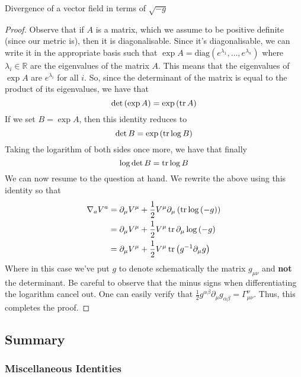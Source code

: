 \begin{thm}{Divergence of a vector field in terms of $\sqrt{ - g }  $}
\begin{proof}
	Observe that if $ A $ is a matrix, which we assume 
	to be positive definite (since our metric is), then 
	it is diagonalisable. Since it's diagonalisable, 
	we can write it in the appropriate basis such that 
	$ \exp A  = \text{diag} \left( e ^{ \lambda _ 1 }, \dots, e ^{ \lambda _ n } \right) $ where $ \lambda _i \in \mathbb{R }$ are the eigenvalues of the matrix $ A $. This means that the eigenvalues of $ \exp A $ are $ e ^{ \lambda _ i } $ for all $ i $. So, since the determinant of the matrix is equal to 
	the product of its eigenvalues, we have that 
	\[
		\det \left( \exp A  \right)   = \exp \left( \tr A  \right)  
	\] If we set $ B = \exp A $, then this identity reduces to 
	\[
		\det B = \exp \left( \tr \log B  \right)  
	\] Taking the logarithm of both sides once more, we 
	have that finally 
	\[
	 \log \det B = \tr \log B 
	\] We can now resume to 
	the question at hand. We rewrite the above using this identity 
	so that 
	\begin{align*}
		\nabla _ a V ^ a &=  \partial  _ \mu V ^ \mu 
		+ \frac{1}{2 } V ^  \mu \partial  _ \mu \left( \tr \log \left(  - g  \right)   \right)  \\ 
		&=  \partial  _ \mu V ^ \mu + \frac{1}{2 } V ^ \mu 
		\tr \partial  _ \mu \log \left(  -g  \right)  \\
		&=  \partial  _ \mu V ^ \mu 
		+ \frac{1}{2 } V ^ \mu \tr \left( g ^{ - 1 } \partial  _ \mu g  \right) 
	\end{align*}
	Where in this case we've put  $ g $ to denote 
	schematically the matrix $ g_{ \mu \nu }  $  and 
	\textbf{not } the determinant. Be careful 
	to observe that the minus signs when 
	differentiating the logarithm cancel out. 
	One can easily verify that $ \frac{1}{2 }g ^{ \alpha \beta } \partial  _ \mu 
	g _{ \alpha \beta }  = \Gamma ^{ \nu } _{ \mu \nu } $. 
	Thus, this completes the proof. 
\end{proof}
\end{thm}


\subsection*{Summary}

\subsubsection*{Miscellaneous Identities}

